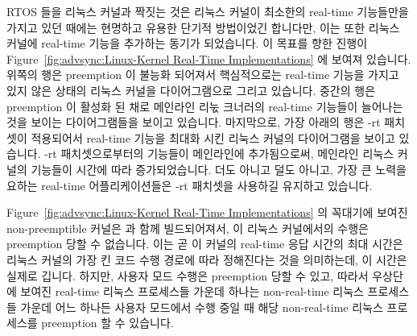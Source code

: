 RTOS 들을 리눅스 커널과 짝짓는 것은 리눅스 커널이 최소한의 real-time 기능들만을
가지고 있던 때에는 현명하고 유용한 단기적 방법이었긴 합니다만, 이는 또한 리눅스
커널에 real-time 기능을 추가하는 동기가 되었습니다.
이 목표를 향한 진행이
Figure~\ref{fig:advsync:Linux-Kernel Real-Time Implementations} 에 보여져 있습니다.
위쪽의 행은 preemption 이 불능화 되어져서 핵심적으로는 real-time 기능을 가지고
있지 않은 상태의 리눅스 커널을 다이어그램으로 그리고 있습니다.
중간의 행은 preemption 이 활성화 된 채로 메인라인 리눇 크너러의 real-time
기능들이 늘어나는 것을 보이는 다이어그램들을 보이고 있습니다.
마지막으로, 가장 아래의 행은 -rt 패치셋이 적용되어서 real-time 기능을 최대화
시킨 리눅스 커널의 다이어그램을 보이고 있습니다.
-rt 패치셋으로부터의 기능들이 메인라인에 추가됨으로써, 메인라인 리눅스 커널의
기능들이 시간에 따라 증가되었습니다.
더도 아니고 덜도 아니고, 가장 큰 노력을 요하는 real-time 어플리케이션들은 -rt
패치셋을 사용하길 유지하고 있습니다.

Figure~\ref{fig:advsync:Linux-Kernel Real-Time Implementations} 의 꼭대기에 보여진
non-preemptible 커널은  과 함께 빌드되어져서, 이 리눅스
커널에서의 수행은 preemption 당할 수 없습니다.
이는 곧 이 커널의 real-time 응답 시간의 최대 시간은 리눅스 커널의 가장 킨 코드
수행 경로에 따라 정해진다는 것을 의미하는데, 이 시간은 실제로 깁니다.
하지만, 사용자 모드 수행은 preemption 당할 수 있고, 따라서 우상단에 보여진
real-time 리눅스 프로세스들 가운데 하나는 non-real-time 리눅스 프로세스들
가운데 어느 하나든 사용자 모드에서 수행 중일 때 해당 non-real-time 리눅스
프로세스를 preemption 할 수 있습니다.
\iffalse

